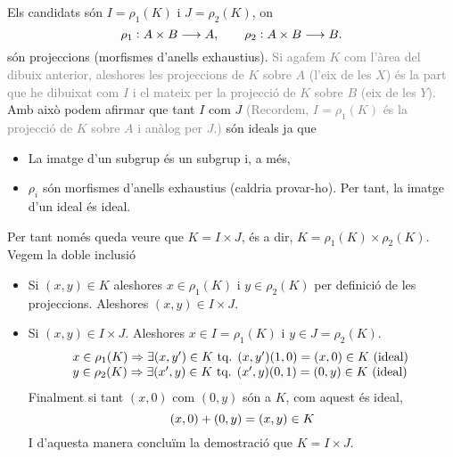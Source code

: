 \documentclass[../main.tex]{subfiles}
\begin{document}
\begin{enumerate}[(a)]
    Els candidats són $I=\rho_1(K)$ i $J=\rho_2(K)$, on 
    \begin{equation}
        \notag
        \rho_1:A\times B \longrightarrow A, \qquad \rho_2:A\times B\longrightarrow B.
    \end{equation}
    són projeccions (morfismes d'anells exhaustius). \textcolor{gray}{Si agafem $K$ com l'àrea del dibuix anterior, aleshores les projeccions de $K$ sobre $A$ (l'eix de les $X$) és la part que he dibuixat com $I$ i el mateix per la projecció de $K$ sobre $B$ (eix de les $Y$).} Amb això podem afirmar que tant $I$ com $J$ \textcolor{gray}{(Recordem, $I=\rho_1(K)$ és la projecció de $K$ sobre $A$ i anàlog per $J$.)} són ideals ja que
    \begin{itemize}
        \item La imatge d'un subgrup és un subgrup i, a més, 
        \item $\rho_i$ són morfismes d'anells exhaustius (caldria provar-ho). Per tant, la imatge d'un ideal és ideal.
    \end{itemize}
    Per tant només queda veure que $K=I\times J$, és a dir, $K=\rho_1(K)\times \rho_2(K)$. Vegem la doble inclusió
    \begin{itemize}
        \item \fbox{$\subseteq$} Si $(x,y)\in K$ aleshores $x\in \rho_1(K)$ i $y\in \rho_2(K)$ per definició de les projeccions. Aleshores $(x,y)\in I\times J$.
        \item \fbox{$\supseteq$} Si $(x,y)\in I\times J$. Aleshores $x\in I = \rho_1(K)$ i $y\in J=\rho_2(K)$.
        \begin{equation}
            \notag
            \begin{array}{ll}
                 x\in \rho_1(K) \Rightarrow \exists (x,y')\in K\text{ tq. } (x,y')(1,0)=(x,0)\in K\text{ (ideal) } \\
                 y\in \rho_2(K) \Rightarrow \exists (x',y)\in K\text{ tq. } (x',y)(0,1)=(0,y)\in K\text{ (ideal) } \\
            \end{array}
        \end{equation}
        Finalment si tant $(x,0)$ com $(0,y)$ són a $K$, com aquest és ideal, 
        \begin{equation}
            \notag
            (x,0)+(0,y)=(x,y)\in K
        \end{equation}
        I d'aquesta manera concluïm la demostració que $K=I\times J$.
    \end{itemize}
    

\end{enumerate}
\end{document}
